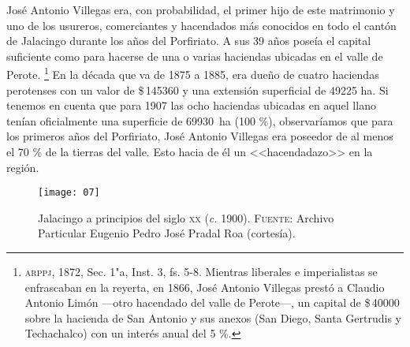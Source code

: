\documentclass[14pt,twoside,final]{extbook} %
\let\oldfootnote\footnote
\renewcommand\footnote[1]{%
\oldfootnote{\hspace{1mm}#1}}
\begin{document}
José Antonio Villegas era, con probabilidad, el primer hijo de este matrimonio y uno de los usureros, comerciantes y hacendados más conocidos en todo el cantón de Jalacingo durante los años del Porfiriato. A sus 39 años poseía el capital suficiente como para hacerse de una o varias haciendas ubicadas en el valle de Perote.\footnote{\textsc{arppj}, 1872, Sec. 1"a, Inst. 3, fs. 5-8. Mientras liberales e imperialistas se enfrascaban en la reyerta, en 1866, José Antonio Villegas prestó a Claudio Antonio Limón ---otro hacendado del valle de Perote---, un capital de \$\,40000 sobre la hacienda de San Antonio y sus anexos (San Diego, Santa Gertrudis y Techachalco) con un interés anual del 5 \%.} En la década que va de 1875 a 1885, era dueño de cuatro haciendas perotenses con un valor de \$\,145360 y una extensión superficial de 49225 ha. Si tenemos en cuenta que para 1907 las ocho haciendas ubicadas en aquel llano tenían oficialmente una superficie de 69930~ha (100 \%), observaríamos que para los primeros años del Porfiriato, José Antonio Villegas era poseedor de al menos el 70 \% de la tierras del valle. Esto hacia de él un <<hacendadazo>> en la región.
\begin{sidewaysfigure}
\centering
\texttt{[image: 07]}
\caption[Jalacingo a principios del siglo \textsc{xx}]{Jalacingo a principios del siglo \textsc{xx} (\emph{c.} 1900). \textsc{Fuente:} Archivo Particular Eugenio Pedro José Pradal Roa (cortesía).}
\label{fig:jalacingo-photo}
\end{sidewaysfigure}
\end{document}
